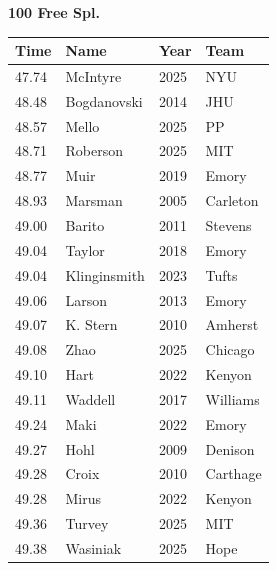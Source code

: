 \noindent\begin{minipage}[t]{0.98\textwidth}
\centering
\textbf{\textcolor{teamprimary}{100 Free Spl.}}\par
\vspace{0.5em}
\centering
\small
\renewcommand{\arraystretch}{1.0}
\setlength{\tabcolsep}{4pt}
\begin{tabular}{@{}p{2.5cm}p{4.5cm}p{1.5cm}p{2.5cm}@{}}
\toprule
\textbf{Time} & \textbf{Name} & \textbf{Year} & \textbf{Team} \\
\midrule
47.74 & McIntyre & 2025 & NYU \\
48.48 & Bogdanovski & 2014 & JHU \\
48.57 & Mello & 2025 & PP \\
48.71 & Roberson & 2025 & MIT \\
48.77 & Muir & 2019 & Emory \\
48.93 & Marsman & 2005 & Carleton \\
49.00 & Barito & 2011 & Stevens \\
49.04 & Taylor & 2018 & Emory \\
49.04 & Klinginsmith & 2023 & Tufts \\
49.06 & Larson & 2013 & Emory \\
49.07 & K. Stern & 2010 & Amherst \\
49.08 & Zhao & 2025 & Chicago \\
49.10 & Hart & 2022 & Kenyon \\
49.11 & Waddell & 2017 & Williams \\
49.24 & Maki & 2022 & Emory \\
49.27 & Hohl & 2009 & Denison \\
49.28 & Croix & 2010 & Carthage \\
49.28 & Mirus & 2022 & Kenyon \\
49.36 & Turvey & 2025 & MIT \\
49.38 & Wasiniak & 2025 & Hope \\
\bottomrule
\end{tabular}
\end{minipage}
\vspace{1.2em}
